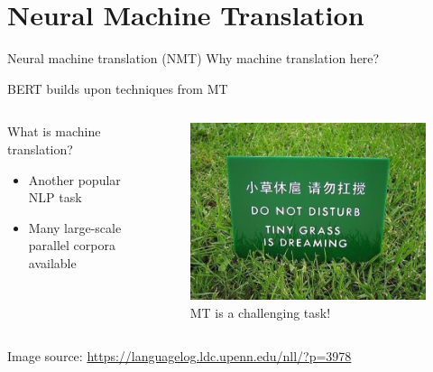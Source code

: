 \documentclass[12pt,aspectratio=169,handout]{beamer}
\begin{document}
\section{Neural Machine Translation}

\begin{frame}{Neural machine translation (NMT)}
	Why machine translation here?
	
	BERT builds upon techniques from MT
	
	\begin{columns}
		\begin{column}{0.5\textwidth}
			What is machine translation?
			
			\begin{itemize}
				\item Another popular NLP task
				\item Many large-scale parallel corpora available
			\end{itemize}
			
			
		\end{column}
		\begin{column}{0.4\textwidth}
			\begin{figure}
				\includegraphics[width=\linewidth]{img/nmt.jpg}
				\caption{MT is a challenging task!}
			\end{figure}	
			
		\end{column}
	\end{columns}
	
	\begin{scriptsize}
		Image source: \url{https://languagelog.ldc.upenn.edu/nll/?p=3978}
	\end{scriptsize}
\end{frame}
\end{document}
